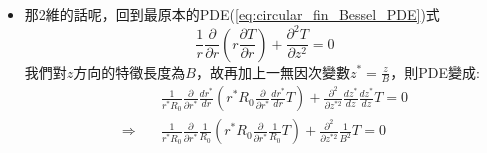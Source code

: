 \documentclass[../main.tex]{subfiles}
\begin{document}
\begin{itemize}
\begin{itemize}
\begin{align}
{          K_1(\alpha) - \frac{K_1(\alpha R_1^\ast)}{I_1(\alpha R_1^\ast)}I_1(\alpha)
        }{
          K_0(\alpha) + \frac{K_1(\alpha R_1^\ast)}{I_1(\alpha R_1^\ast)} I_0(\alpha)
        } \right]
      \end{align}
      我們令整個中刮號內為$F(\alpha, R_1^\ast)$\\
      且$\alpha^2 = \frac{h R_0^2}{kB}= \text{Bi}\frac{R_0^2}{B^2}$\\
      $\alpha = \sqrt{\text{Bi}}\frac{R_0}{B}$\\
      最終熱效率值為:
      \begin{align}
        \eta_f &= \frac{2 k B \alpha}{h_f\left(R_1^2 - R_0^2\right)} F(\alpha, R_1^\ast) \nonumber\\
        &= \frac{2 k B \sqrt{\text{Bi}}\frac{R_0}{B}}{h_f\left(R_1^2 - R_0^2\right)} F(\alpha, R_1^\ast) \nonumber\\
        &= \frac{2 {\color{red}k} B \cancel{R_0} \sqrt{\text{Bi}}}{{\color{red}h_f B} R_0^{\cancel{2}}\left(R_1^{2\ast}-1\right)} F(\alpha, R_1^\ast) \nonumber\\
        &= \frac{2 B \sqrt{\text{Bi}}}{R_0\left(R_1^{2\ast}-1\right)\text{Bi}} F(\alpha, R_1^\ast) \nonumber\\
        &= \frac{2B}{R_0\left(R_1^{2\ast}-1\right)\sqrt{\text{Bi}}} F(\alpha, R_1^\ast) \label{eq:circular_fin_efficiency_final}
      \end{align}
      \item 那2維的話呢，回到最原本的PDE(\ref{eq:circular_fin_Bessel_PDE})式
      \begin{equation}
        \frac{1}{r}\frac{\partial}{\partial r}\left(r \frac{\partial T}{\partial r}\right) + \frac{\partial^2 T}{\partial z^2} = 0
      \end{equation}
      我們對$z$方向的特徵長度為$B$，故再加上一無因次變數$z^\ast = \frac{z}{B}$，則PDE變成:
      \begin{align}
        &\frac{1}{r^\ast R_0}\frac{\partial}{\partial r^\ast}\frac{dr^\ast}{dr} \left(
          r^\ast R_0 \frac{\partial}{\partial r^\ast}\frac{d r^\ast}{dr} T
        \right) + \frac{\partial^2}{\partial z^{\ast 2}}\frac{d z^\ast}{dz}\frac{d z^\ast}{dz} T = 0 \nonumber\\
        \Rightarrow\quad & \frac{1}{r^\ast R_0}\frac{\partial}{\partial r^\ast}\frac{1}{R_0} \left(
          r^\ast R_0 \frac{\partial}{\partial r^\ast}\frac{1}{R_0} T
        \right) + \frac{\partial^2}{\partial z^{\ast 2}}\frac{1}{B^2} T = 0 \nonumber\\

\end{align}
\end{itemize}
\end{itemize}
\end{document}

